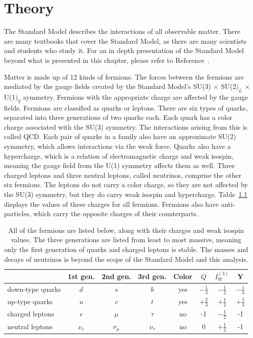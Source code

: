 \chapter{Theory} \label{ch:theory}

The Standard Model describes the interactions of all observable matter.
There are many textbooks that cover the Standard Model, as there are many scientists and students who study it.
For an in depth presentation of the Standard Model beyond what is presented in this chapter,
please refer to Reference~\cite{Thomson:1529540}.

Matter is made up of 12 kinds of fermions.
The forces between the fermions are mediated by the gauge fields
created by the Standard Model's SU(3) $\times$ SU(2$)_L$ $\times$ U(1$)_Y$ symmetry.
Fermions with the appropriate charge are affected by the gauge fields.
Fermions are classified as quarks or leptons.
There are six types of quarks, separated into three generations of two quarks each.
Each quark has a color charge associated with the SU(3) symmetry.
The interactions arising from this is called QCD.
Each pair of quarks in a family also have an approximate SU(2) symmetry,
which allows interactions via the weak force.
Quarks also have a hypercharge, which is a relation of electromagnetic charge and weak isospin,
meaning the gauge field from the U(1) symmetry affects them as well.
Three charged leptons and three neutral leptons, called neutrinos, comprise the other six fermions.
The leptons do not carry a color charge, so they are not affected by the SU(3) symmetry,
but they do carry weak isospin and hypercharge.
Table~\ref{tab:fermions} displays the values of these charges for all fermions.
Fermions also have anti-particles, which carry the opposite charges of their counterparts.
\begin{table}
  \centering
  \caption[Fermion charges]{
    All of the fermions are listed below,
    along with their charges and weak isospin values.
    The three generations are listed from least to most massive,
    meaning only the first generation of quarks and charged leptons is stable.
    The masses and decays of neutrinos is beyond the scope of the Standard Model and this analysis.
  }
  {\renewcommand{\arraystretch}{1.5}
  \begin{tabular}{|l|c c c c c c c|}
    \hline
    & 1st gen. & 2nd gen. & 3rd gen. & Color & $Q$ & $I_W^{(3)}$ & Y \\
    \hline
    down-type quarks & $d$ & $s$ & $b$ & yes & $-\frac13$ & $-\frac12$ & $-\frac13$ \\
    up-type quarks & $u$ & $c$ & $t$ & yes & $+\frac23$ & $+\frac12$ & $+\frac53$ \\
    charged leptons & $e$ & $\mu$ & $\tau$ & no & -1 & $-\frac12$ & -1 \\
    neutral leptons & $\nu_e$ & $\nu_\mu$ & $\nu_\tau$ & no & 0 & $+\frac12$ & -1 \\
    \hline
  \end{tabular}}
  \label{tab:fermions}
\end{table}

